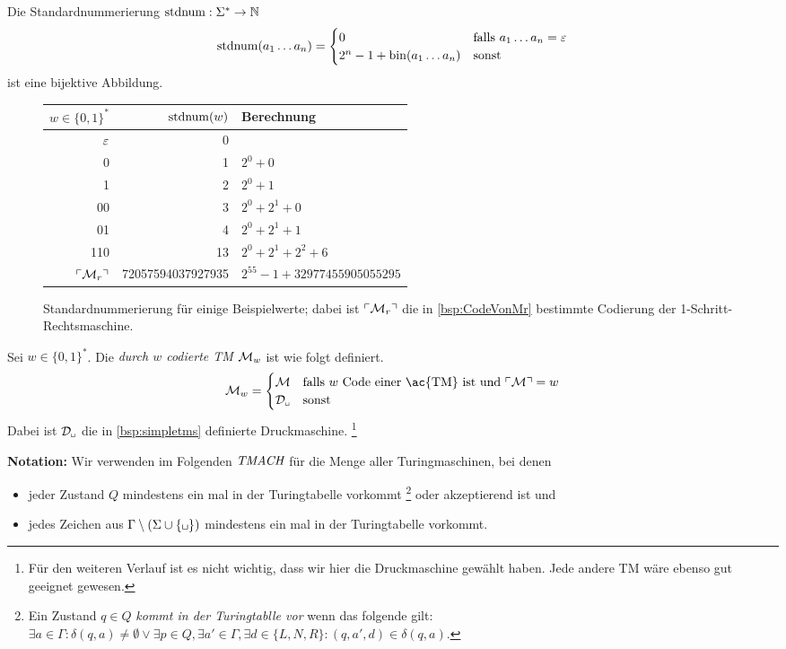 \begin{lemma}\label{satz:stdnum}
Die Standardnummerierung $\operatorname{stdnum}: \Sigma^*\rightarrow\mathbb{N}$ 
 $$ \operatorname{stdnum}(a_1\dots a_n)=\begin{cases}
0 & \text{falls } a_1\dots a_n=\varepsilon\\
2^{n}-1+\operatorname{bin}(a_1\dots a_n) & \text{sonst}
\end{cases}$$
ist eine bijektive Abbildung.
\end{lemma}


 \begin{figure}[H]\centering
    \begin{tabular}{rr@{\qquad}l}
    $w\in\{0,1\}^*$ & $\operatorname{stdnum}(w)$ & Berechnung\\ \hline
    $\varepsilon$ & 0 \\
    0 & 1 & $2^0 + 0$\\
    1 & 2 & $2^0 + 1$\\
    00 & 3 & $2^0 + 2^1 + 0$\\
    01 & 4 & $2^0 + 2^1 + 1$\\
    110 & 13 & $2^0 + 2^1 + 2^2 + 6$\\
    $\ulcorner \mathcal{M}_r \urcorner$ & 72057594037927935 & $2^{55} - 1 + 32977455905055295$
    \end{tabular}

	\caption{Standardnummerierung für einige Beispielwerte; dabei ist $\ulcorner \mathcal{M}_r \urcorner$
	die in \autoref{bsp:CodeVonMr} bestimmte Codierung der 1-Schritt-Rechtsmaschine.}
\end{figure}


\begin{Def}
 Sei $w\in\{0,1\}^*$.
 Die \emph{durch $w$ codierte \ac{TM}} $\mathcal{M}_w$ ist wie folgt definiert.
 $$\M_w=\begin{cases}
\M & \text{falls } w \text{ Code einer \ac{TM} ist und } \godel{\M}=w\\
\D_\mblank & \text{sonst}
\end{cases}$$
Dabei ist $\D_\mblank$ die in \autoref{bsp:simpletms} definierte Druckmaschine.%
\footnote{Für den weiteren Verlauf ist es nicht wichtig, dass wir hier die Druckmaschine gewählt haben. Jede andere \ac{TM} wäre ebenso gut geeignet gewesen.}
\end{Def}

\textbf{Notation:}
Wir verwenden im Folgenden $\textit{TMACH}$ für die Menge aller Turingmaschinen, bei denen 
\begin{itemize}
 \item jeder Zustand $Q$ mindestens ein mal in der Turingtabelle vorkommt
 \footnote{Ein Zustand $q\in Q$ \emph{kommt in der Turingtablle vor} wenn das folgende gilt:
 $\exists a\in\Gamma: \delta(q,a)\neq\emptyset\lor \exists p\in Q, \exists a'\in\Gamma, \exists d\in\{L,N,R\}: (q,a',d)\in\delta(q,a)$.}
 oder akzeptierend ist und
 \item jedes Zeichen aus $\Gamma\setminus(\Sigma\cup\{\mblank\})$ mindestens ein mal in der Turingtabelle vorkommt.
\end{itemize}



